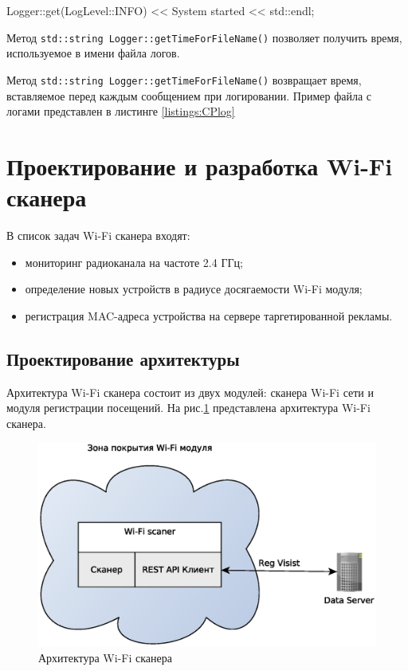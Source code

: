 Logger::get(LogLevel::INFO) << System started << std::endl;

Метод \texttt{std::string Logger::getTimeForFileName()} позволяет получить время, используемое в имени файла логов.

Метод \texttt{std::string Logger::getTimeForFileName()} возвращает время, вставляемое перед каждым сообщением при логировании. Пример файла с логами представлен в листинге \ref{listings:CPlog}

\section{Проектирование и разработка Wi-Fi сканера}

В список задач Wi-Fi сканера входят:

\begin{itemize}
	\item мониторинг радиоканала на частоте 2.4 ГГц;
	\item определение новых устройств в радиусе досягаемости Wi-Fi модуля;
	\item регистрация MAC-адреса устройства на сервере таргетированной рекламы.
\end{itemize}

\subsection{Проектирование архитектуры}

Архитектура Wi-Fi сканера состоит из двух модулей: сканера Wi-Fi сети и модуля регистрации посещений. На рис.\ref{fig:WiFiScanerArch} представлена архитектура Wi-Fi сканера.

\begin{figure}[H]
	\centering
	\includegraphics[width=\linewidth]{fig/WiFiScanerArch}
	\caption{Архитектура Wi-Fi сканера}
	\label{fig:WiFiScanerArch}
\end{figure}

